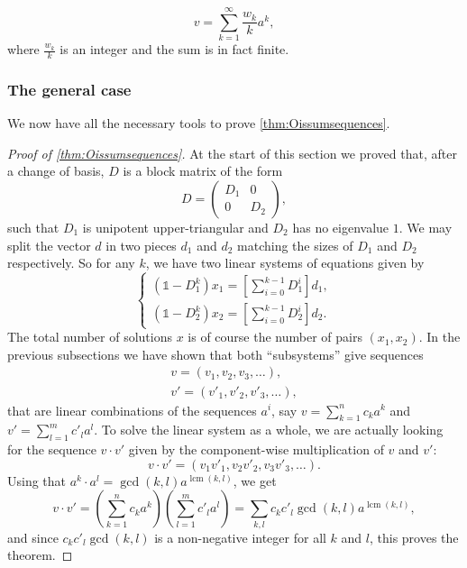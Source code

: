 \documentclass[a4paper]{article}
\theoremstyle{plain}
\theoremstyle{definition}
\theoremstyle{remark}
\DeclareMathOperator{\lcm}{lcm}
\newcommand{\I}{\mathds{1}}
\begin{document}
\[v = \sum_{k=1}^\infty \frac{w_k}{k} a^k ,\]
where $\frac{w_k}{k}$ is an integer and the sum is in fact finite.

\subsubsection{The general case}
We now have all the necessary tools to prove \cref{thm:Oissumsequences}.
\begin{proof}[Proof of \cref{thm:Oissumsequences}]
	At the start of this section we proved that, after a change of basis, \(D\) is a block matrix of the form
	\begin{equation*}
	D = \begin{pmatrix}
	D_1 & 0\\
	0 & D_2
	\end{pmatrix},
	\end{equation*}
	such that \(D_1\) is unipotent upper-triangular and \(D_2\) has no eigenvalue \(1\). We may split the vector \(d\) in two pieces \(d_1\) and \(d_2\) matching the sizes of \(D_1\) and \(D_2\) respectively. So for any \(k\), we have two linear systems of equations given by
	\begin{equation*}
	\begin{cases}
	(\I - D_1^k)x_1 = \left[\sum_{i=0}^{k-1}D_1^i\right] d_1, \\
	(\I - D_2^k)x_2 = \left[\sum_{i=0}^{k-1}D_2^i\right] d_2 .
	\end{cases}
	\end{equation*}
	The total number of solutions \(x\) is of course the number of pairs \((x_1,x_2)\). In the previous subsections we have shown that both ``subsystems'' give sequences
	\begin{align*}
	v = (v_1,v_2,v_3,\dots), \\
	v' = (v'_1,v'_2,v'_3,\dots),
	\end{align*}
	that are linear combinations of the sequences \(a^i\), say
	$v=\sum_{k=1}^n c_k a^k$ and $v'= \sum_{l=1}^m c'_l a^l$. To solve the linear system as a whole, we are actually looking for the sequence \(v\cdot v'\) given by the component-wise multiplication of \(v\) and \(v'\):
	\begin{equation*}
	v \cdot v' = (v_1v'_1,v_2v'_2,v_3v'_3,\dots).
	\end{equation*}
	Using that \(a^k \cdot a^l = \gcd(k,l)a^{\lcm(k,l)}\), we get
	\begin{equation*}
	v \cdot v' = \left(\sum_{k=1}^n c_k a^k\right)\left(\sum_{l=1}^m c'_l a^l\right) = \sum_{k,l} c_kc'_l \gcd(k,l)a^{\lcm(k,l)},
	\end{equation*}
	and since \(c_kc'_l\gcd(k,l)\) is a non-negative integer for all \(k\) and \(l\), this proves the theorem.
\end{proof}
\end{document}
